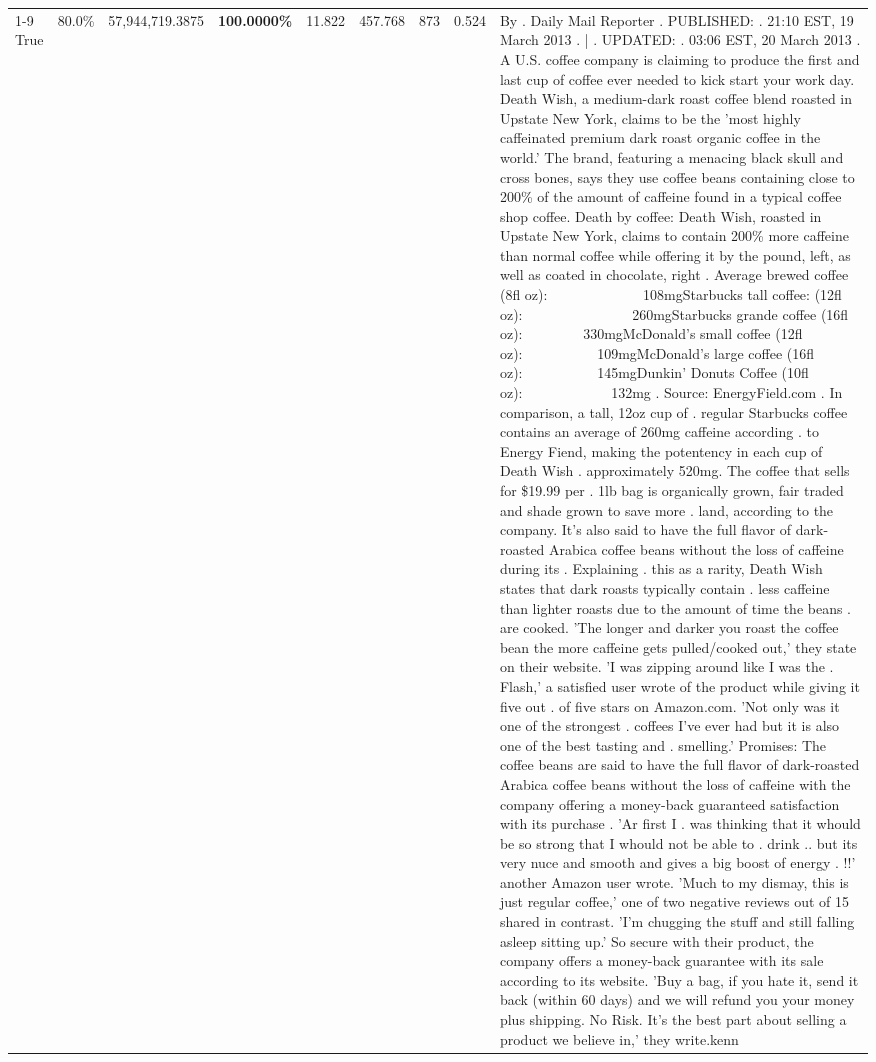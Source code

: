 \begin{table}[H]
{\begin{tabular}{lllrlllll}
\cline{1-9}
True & 80.0\% & 57,944,719.3875 & \bfseries \color{red} 100.0000\% & 11.822 & 457.768 & 873 & 0.524 & By . Daily Mail Reporter . PUBLISHED: . 21:10 EST, 19 March 2013 . | . UPDATED: . 03:06 EST, 20 March 2013 . A U.S. coffee company is claiming to produce the first and last cup of coffee ever needed to kick start your work day. Death Wish, a medium-dark roast coffee blend roasted in Upstate New York, claims to be the 'most highly caffeinated premium dark roast organic coffee in the world.' The brand, featuring a menacing black skull and cross bones, says they use coffee beans containing close to 200\% of the amount of caffeine found in a typical coffee shop coffee. Death by coffee: Death Wish, roasted in Upstate New York, claims to contain 200\% more caffeine than normal coffee while offering it by the pound, left, as well as coated in chocolate, right . Average brewed coffee (8fl oz):              108mgStarbucks tall coffee: (12fl oz):                260mgStarbucks grande coffee (16fl oz):         330mgMcDonald's small coffee (12fl oz):           109mgMcDonald's large coffee (16fl oz):           145mgDunkin' Donuts Coffee (10fl oz):             132mg . Source: EnergyField.com . In comparison, a tall, 12oz cup of . regular Starbucks coffee contains an average of 260mg caffeine according . to Energy Fiend, making the potentency in each cup of Death Wish . approximately 520mg. The coffee that sells for \$19.99 per . 1lb bag is organically grown, fair traded and shade grown to save more . land, according to the company. It's also said to have the full flavor of dark-roasted Arabica coffee beans without the loss of caffeine during its . Explaining . this as a rarity, Death Wish states that dark roasts typically contain . less caffeine than lighter roasts due to the amount of time the beans . are cooked. 'The longer and darker you roast the coffee bean the more caffeine gets pulled/cooked out,' they state on their website. 'I was zipping around like I was the . Flash,' a satisfied user wrote of the product while giving it five out . of five stars on Amazon.com. 'Not only was it one of the strongest . coffees I've ever had but it is also one of the best tasting and . smelling.’ Promises: The coffee beans are said to have the full flavor of dark-roasted Arabica coffee beans without the loss of caffeine with the company offering a money-back guaranteed satisfaction with its purchase . 'Ar first I . was thinking that it whould be so strong that I whould not be able to . drink .. but its very nuce and smooth and gives a big boost of energy . !!' another Amazon user wrote. 'Much to my dismay, this is just regular coffee,' one of two negative reviews out of 15 shared in contrast. 'I'm chugging the stuff and still falling asleep sitting up.' So secure with their product, the company offers a money-back guarantee with its sale according to its website. 'Buy a bag, if you hate it, send it back (within 60 days) and we will refund you your money plus shipping. No Risk. It’s the best part about selling a product we believe in,' they write.kenn \\

\end{tabular}}
\end{table}
